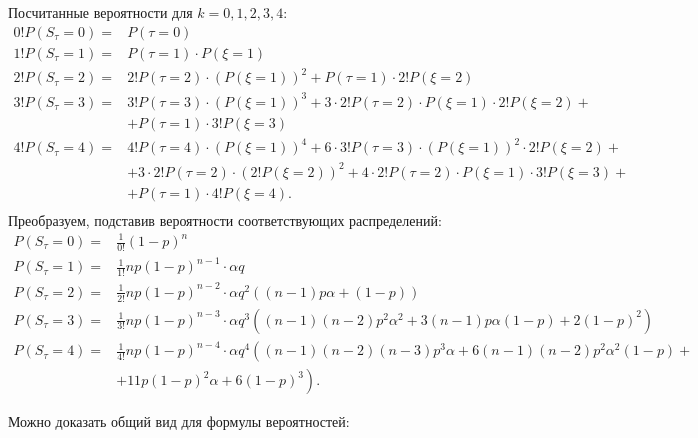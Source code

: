 \documentclass[12pt, specialist, subf, substylefile = spbu_report.rtx]{disser}
\begin{document}
	Посчитанные вероятности для $ k = 0, 1, 2, 3, 4 $:
	\[ 
	\begin{aligned}
		0! P(S _\tau = 0) =& P(\tau = 0)\\
		1! P(S _\tau = 1) =& P(\tau = 1) \cdot P(\xi = 1)\\
		2! P(S _\tau = 2) =& 2! P(\tau = 2) \cdot \left(P(\xi = 1)\right) ^2 + P(\tau = 1) \cdot 2!P(\xi = 2)\\
		3! P(S _\tau = 3) =& 3! P(\tau = 3) \cdot \left(P(\xi = 1)\right) ^3 + 3 \cdot 2!P(\tau = 2) \cdot P(\xi = 1) \cdot 2! P(\xi = 2) +\\
		&+ P(\tau = 1) \cdot 3!P(\xi = 3)\\
		4! P(S _\tau = 4) =& 4! P(\tau = 4) \cdot \left(P(\xi = 1)\right) ^4 + 6 \cdot 3! P(\tau = 3) \cdot \left(P(\xi = 1)\right) ^2 \cdot 2! P(\xi = 2) + \\
		&+ 3 \cdot 2! P(\tau = 2) \cdot \left(2! P(\xi = 2)\right) ^2 + 4 \cdot 2! P(\tau = 2) \cdot P(\xi = 1) \cdot 3! P(\xi = 3) +\\
		&+ P(\tau = 1) \cdot 4! P(\xi = 4).\\
	\end{aligned}
	\]
	Преобразуем, подставив вероятности соответствующих распределений:
	\[ 
	\begin{aligned}
		P(S _\tau = 0) =& \frac 1 {0!} (1 - p) ^n\\
		P(S _\tau = 1) =& \frac 1 {1!} n p (1 - p) ^{n - 1} \cdot \alpha q\\
		P(S _\tau = 2) =& \frac 1 {2!} n p (1 - p) ^{n - 2} \cdot \alpha q ^2 \left( (n - 1) p \alpha + (1 - p) \right)\\
		P(S _\tau = 3) =& \frac 1 {3!} n p (1 - p) ^{n - 3} \cdot \alpha q ^3 \left( (n - 1)(n - 2) p ^2 \alpha ^2 + 3 (n - 1) p \alpha (1 - p) + 2 (1 - p) ^2 \right)\\
		P(S _\tau = 4) =& \frac 1 {4!} n p (1 - p) ^{n - 4} \cdot \alpha q ^4 \left( (n - 1)(n - 2)(n - 3) p ^3 \alpha + 6 (n - 1)(n - 2) p ^2 \alpha ^2 (1 - p) +\right.\\
		&\left.+ 11 p (1 - p) ^2 \alpha + 6 (1 - p) ^3 \right).
	\end{aligned}
	\]
	
	Можно доказать общий вид для формулы вероятностей:
	
\end{document}
